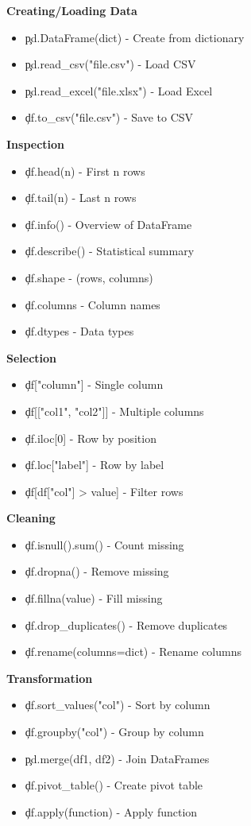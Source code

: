 \begin{tcolorbox}[
    title=Pandas Essential Commands,
    colframe=blue,
    colback=white,
    arc=2mm
]
\textbf{Creating/Loading Data}
\begin{itemize}
\item \c{pd.DataFrame(dict)} - Create from dictionary
\item \c{pd.read_csv("file.csv")} - Load CSV
\item \c{pd.read_excel("file.xlsx")} - Load Excel
\item \c{df.to_csv("file.csv")} - Save to CSV
\end{itemize}

\textbf{Inspection}
\begin{itemize}
\item \c{df.head(n)} - First n rows
\item \c{df.tail(n)} - Last n rows
\item \c{df.info()} - Overview of DataFrame
\item \c{df.describe()} - Statistical summary
\item \c{df.shape} - (rows, columns)
\item \c{df.columns} - Column names
\item \c{df.dtypes} - Data types
\end{itemize}

\textbf{Selection}
\begin{itemize}
\item \c{df["column"]} - Single column
\item \c{df[["col1", "col2"]]} - Multiple columns
\item \c{df.iloc[0]} - Row by position
\item \c{df.loc["label"]} - Row by label
\item \c{df[df["col"] > value]} - Filter rows
\end{itemize}

\textbf{Cleaning}
\begin{itemize}
\item \c{df.isnull().sum()} - Count missing
\item \c{df.dropna()} - Remove missing
\item \c{df.fillna(value)} - Fill missing
\item \c{df.drop_duplicates()} - Remove duplicates
\item \c{df.rename(columns=dict)} - Rename columns
\end{itemize}

\textbf{Transformation}
\begin{itemize}
\item \c{df.sort_values("col")} - Sort by column
\item \c{df.groupby("col")} - Group by column
\item \c{pd.merge(df1, df2)} - Join DataFrames
\item \c{df.pivot_table()} - Create pivot table
\item \c{df.apply(function)} - Apply function
\end{itemize}


\end{tcolorbox}
